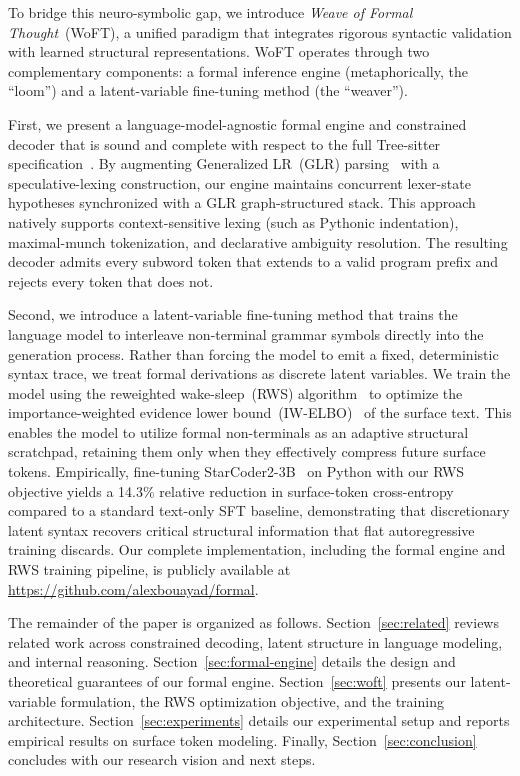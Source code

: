 \documentclass[11pt]{article}
\theoremstyle{plain}
\theoremstyle{definition}
\begin{document}
To bridge this neuro-symbolic gap, we introduce \emph{Weave of Formal
Thought}~(WoFT), a unified paradigm that integrates rigorous syntactic
validation with learned structural representations. WoFT operates through two
complementary components: a formal inference engine (metaphorically, the
``loom'') and a latent-variable fine-tuning method (the ``weaver'').

First, we present a language-model-agnostic formal engine and constrained
decoder that is sound and complete with respect to the full Tree-sitter
specification~\cite{tree-sitter-2026}. By augmenting Generalized LR~(GLR)
parsing~\cite{tomita-1987} with a speculative-lexing construction, our engine
maintains concurrent lexer-state hypotheses synchronized with a GLR
graph-structured stack. This approach natively supports context-sensitive lexing
(such as Pythonic indentation), maximal-munch tokenization, and declarative
ambiguity resolution. The resulting decoder admits every subword token that
extends to a valid program prefix and rejects every token that does not.

Second, we introduce a latent-variable fine-tuning method that trains the
language model to interleave non-terminal grammar symbols directly into the
generation process. Rather than forcing the model to emit a fixed, deterministic
syntax trace, we treat formal derivations as discrete latent variables. We train
the model using the reweighted wake-sleep~(RWS) algorithm~\cite{rws-2015} to
optimize the importance-weighted evidence lower bound~(IW-ELBO)~\cite{iwae-2016}
of the surface text. This enables the model to utilize formal non-terminals as
an adaptive structural scratchpad, retaining them only when they effectively
compress future surface tokens. Empirically, fine-tuning
StarCoder2-3B~\cite{starcoder2-2024} on Python with our RWS objective yields a
14.3\% relative reduction in surface-token cross-entropy compared to a standard
text-only SFT baseline, demonstrating that discretionary latent syntax recovers
critical structural information that flat autoregressive training discards. Our
complete implementation, including the formal engine and RWS training pipeline,
is publicly available at \url{https://github.com/alexbouayad/formal}.

The remainder of the paper is organized as follows. Section~\ref{sec:related}
reviews related work across constrained decoding, latent structure in language
modeling, and internal reasoning. Section~\ref{sec:formal-engine} details the
design and theoretical guarantees of our formal engine. Section~\ref{sec:woft}
presents our latent-variable formulation, the RWS optimization objective, and
the training architecture. Section~\ref{sec:experiments} details our
experimental setup and reports empirical results on surface token modeling.
Finally, Section~\ref{sec:conclusion} concludes with our research vision and
next steps.
\end{document}
